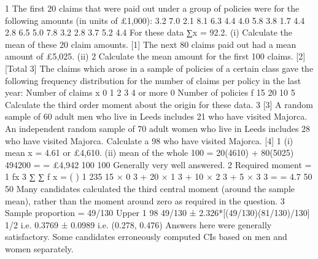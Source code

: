 1
The first 20 claims that were paid out under a group of policies were for the following
amounts (in units of £1,000):
3.2
7.0
2.1
8.1
6.3
4.4
4.0
5.8
3.8
1.7
4.4
2.8
6.5
5.0
7.8
3.2
2.8
3.7
5.2
4.4
For these data ∑x = 92.2.
(i)
Calculate the mean of these 20 claim amounts.
[1]
The next 80 claims paid out had a mean amount of £5,025.
(ii)
2
Calculate the mean amount for the first 100 claims.
[2]
[Total 3]
The claims which arose in a sample of policies of a certain class gave the following
frequency distribution for the number of claims per policy in the last year:
Number of claims x 0 1 2 3 4 or more
0
Number of policies f 15 20 10 5
Calculate the third order moment about the origin for these data.
3
[3]
A random sample of 60 adult men who live in Leeds includes 21 who have visited
Majorca. An independent random sample of 70 adult women who live in Leeds
includes 28 who have visited Majorca.
Calculate a 98%
who have visited Majorca.
[4]
1
(i) mean x = 4.61 or £4,610.
(ii) mean of the whole 100 =
20(4610) + 80(5025) 494200
=
= £4,942
100
100
Generally very well answered.
2
Required moment =
1
fx 3
∑
∑ f
x
=
(
)
1
235
15 × 0 3 + 20 × 1 3 + 10 × 2 3 + 5 × 3 3 =
= 4.7
50
50
Many candidates calculated the third central moment (around the sample mean), rather than
the moment around zero as required in the question.
3
Sample proportion = 49/130
Upper 1%
98%
49/130 ± 2.326*[(49/130)(81/130)/130] 1/2 i.e. 0.3769 ± 0.0989 i.e. (0.278, 0.476)
Answers here were generally satisfactory. Some candidates erroneously computed CIs based
on men and women separately.
